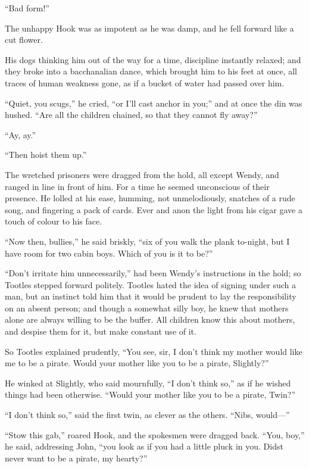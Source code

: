 ``Bad form!''

The unhappy Hook was as impotent as he was damp, and he fell forward
like a cut flower.

His dogs thinking him out of the way for a time, discipline instantly
relaxed; and they broke into a bacchanalian dance, which brought him to
his feet at once, all traces of human weakness gone, as if a bucket of
water had passed over him.

``Quiet, you scugs,'' he cried, ``or I'll cast anchor in you;'' and at once
the din was hushed. ``Are all the children chained, so that they cannot
fly away?''

``Ay, ay.''

``Then hoist them up.''

The wretched prisoners were dragged from the hold, all except Wendy,
and ranged in line in front of him. For a time he seemed unconscious of
their presence. He lolled at his ease, humming, not unmelodiously,
snatches of a rude song, and fingering a pack of cards. Ever and anon
the light from his cigar gave a touch of colour to his face.

``Now then, bullies,'' he said briskly, ``six of you walk the plank
to-night, but I have room for two cabin boys. Which of you is it to
be?''

``Don't irritate him unnecessarily,'' had been Wendy's instructions in
the hold; so Tootles stepped forward politely. Tootles hated the idea
of signing under such a man, but an instinct told him that it would be
prudent to lay the responsibility on an absent person; and though a
somewhat silly boy, he knew that mothers alone are always willing to be
the buffer. All children know this about mothers, and despise them for
it, but make constant use of it.

So Tootles explained prudently, ``You see, sir, I don't think my mother
would like me to be a pirate. Would your mother like you to be a
pirate, Slightly?''

He winked at Slightly, who said mournfully, ``I don't think so,'' as if
he wished things had been otherwise. ``Would your mother like you to be
a pirate, Twin?''

``I don't think so,'' said the first twin, as clever as the others.
``Nibs, would—''

``Stow this gab,'' roared Hook, and the spokesmen were dragged back.
``You, boy,'' he said, addressing John, ``you look as if you had a little
pluck in you. Didst never want to be a pirate, my hearty?''

